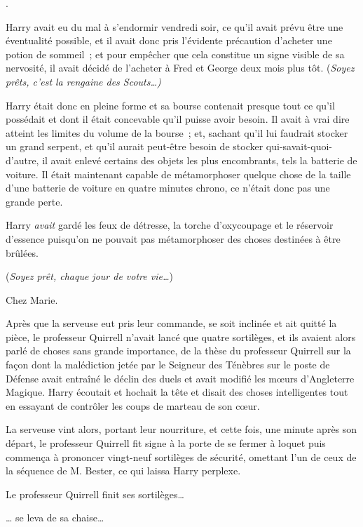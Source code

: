 
.

\hplettrineextrapara
Harry avait eu du mal à s'endormir vendredi soir, ce qu'il avait prévu être une éventualité possible, et il avait donc pris l'évidente précaution d'acheter une potion de sommeil~; et pour empêcher que cela constitue un signe visible de sa nervosité, il avait décidé de l'acheter à Fred et George deux mois plus tôt.
(\emph{Soyez prêts, c'est la rengaine des Scouts…)}

Harry était donc en pleine forme et sa bourse contenait presque tout ce qu'il possédait et dont il était concevable qu'il puisse avoir besoin.
Il avait à vrai dire atteint les limites du volume de la bourse~; et, sachant qu'il lui faudrait stocker un grand serpent, et qu'il aurait peut-être besoin de stocker qui-savait-quoi-d'autre, il avait enlevé certains des objets les plus encombrants, tels la batterie de voiture.
Il était maintenant capable de métamorphoser quelque chose de la taille d'une batterie de voiture en quatre minutes chrono, ce n'était donc pas une grande perte.

Harry \emph{avait} gardé les feux de détresse, la torche d'oxycoupage et le réservoir d'essence puisqu'on ne pouvait pas métamorphoser des choses destinées à être brûlées.

(\emph{Soyez prêt, chaque jour de votre vie…})

Chez Marie.

Après que la serveuse eut pris leur commande, se soit inclinée et ait quitté la pièce, le professeur Quirrell n'avait lancé que quatre sortilèges, et ils avaient alors parlé de choses sans grande importance, de la thèse du professeur Quirrell sur la façon dont la malédiction jetée par le Seigneur des Ténèbres sur le poste de Défense avait entraîné le déclin des duels et avait modifié les mœurs d'Angleterre Magique.
Harry écoutait et hochait la tête et disait des choses intelligentes tout en essayant de contrôler les coups de marteau de son cœur.

La serveuse vint alors, portant leur nourriture, et cette fois, une minute après son départ, le professeur Quirrell fit signe à la porte de se fermer à loquet puis commença à prononcer vingt-neuf sortilèges de sécurité, omettant l'un de ceux de la séquence de M. Bester, ce qui laissa Harry perplexe.

Le professeur Quirrell finit ses sortilèges…

… se leva de sa chaise…

